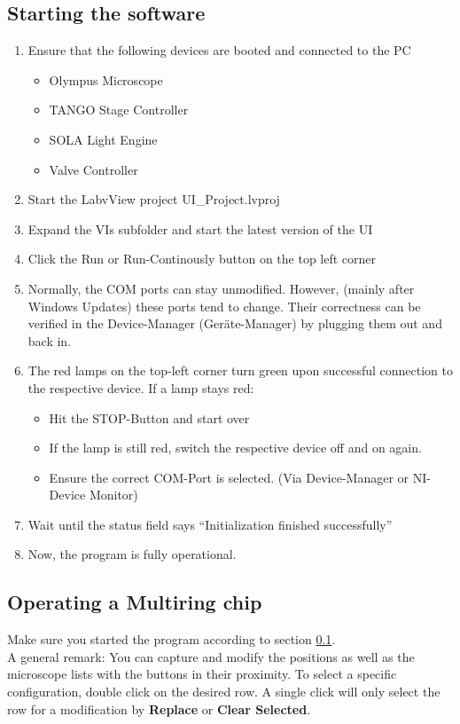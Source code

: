 \documentclass{article}
\begin{document}
\subsection{Starting the software}
\label{sec:software_start}
\begin{enumerate}
	\item Ensure that the following devices are booted and connected to the PC
	\begin{itemize}
		\item Olympus Microscope
		\item TANGO Stage Controller
		\item SOLA Light Engine
		\item Valve Controller 
	\end{itemize}
	\item Start the LabvView project UI\_{}Project.lvproj
	\item Expand the VIs subfolder and start the latest version of the UI
	\item Click the Run or Run-Continously button on the top left corner
	\item Normally, the COM ports can stay unmodified. However, (mainly after Windows Updates) these ports tend to change. Their correctness can be verified in the Device-Manager (Geräte-Manager) by plugging them out and back in.
	\item The red lamps on the top-left corner turn green upon successful connection to the respective device.
	\subitem If a lamp stays red:
	\begin{itemize}
		\item Hit the STOP-Button and start over
		\item If the lamp is still red, switch the respective device off and on again.
		\item Ensure the correct COM-Port is selected. (Via Device-Manager or NI-Device Monitor)
	\end{itemize}

	\item Wait until the status field says ``Initialization finished successfully''
	\item 	Now, the program is fully operational.
\end{enumerate}



\subsection{Operating a Multiring chip}
Make sure you started the program according to section \ref{sec:software_start}.\\
A general remark: You can capture and modify the positions as well as the microscope lists with the buttons in their proximity. To select a specific configuration, double click on the desired row. A single click will only select the row for a modification by \textbf{Replace} or \textbf{Clear Selected}. 
\end{document}
